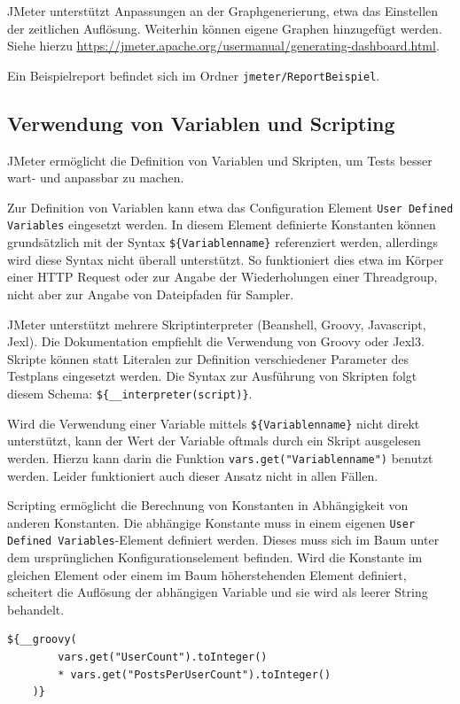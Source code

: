JMeter unterstützt Anpassungen an der Graphgenerierung, etwa das Einstellen der zeitlichen Auflösung.
Weiterhin können eigene Graphen hinzugefügt werden. 
Siehe hierzu \url{https://jmeter.apache.org/usermanual/generating-dashboard.html}.

Ein Beispielreport befindet sich im Ordner \texttt{jmeter/ReportBeispiel}.



\subsection{Verwendung von Variablen und Scripting}

JMeter ermöglicht die Definition von Variablen und Skripten, um Tests besser wart- und anpassbar zu machen.

Zur Definition von Variablen kann etwa das Configuration Element \texttt{User Defined Variables} eingesetzt werden.
In diesem Element definierte Konstanten können grundsätzlich mit der Syntax \lstinline|${Variablenname}| referenziert werden,
allerdings wird diese Syntax nicht überall unterstützt.
So funktioniert dies etwa im Körper einer HTTP Request oder zur Angabe der Wiederholungen einer Threadgroup,
nicht aber zur Angabe von Dateipfaden für Sampler.

JMeter unterstützt mehrere Skriptinterpreter (Beanshell, Groovy, Javascript, Jexl). 
Die Dokumentation empfiehlt die Verwendung von Groovy oder Jexl3.
Skripte können statt Literalen zur Definition verschiedener Parameter des Testplans eingesetzt werden.
Die Syntax zur Ausführung von Skripten folgt diesem Schema: \lstinline|${__interpreter(script)}|.

Wird die Verwendung einer Variable mittels \lstinline|${Variablenname}| nicht direkt unterstützt,
kann der Wert der Variable oftmals durch ein Skript ausgelesen werden.
Hierzu kann darin die Funktion \lstinline{vars.get("Variablenname")} benutzt werden.
Leider funktioniert auch dieser Ansatz nicht in allen Fällen.

Scripting ermöglicht die Berechnung von Konstanten in Abhängigkeit von anderen Konstanten.
Die abhängige Konstante muss in einem eigenen \texttt{User Defined Variables}-Element definiert werden.
Dieses muss sich im Baum unter dem ursprünglichen Konfigurationselement befinden.
Wird die Konstante im gleichen Element oder einem im Baum höherstehenden Element definiert,
scheitert die Auflösung der abhängigen Variable und sie wird als leerer String behandelt.

\begin{lstlisting}[caption=Beispiel eines Groovy-Skripts]
    ${__groovy(
        vars.get("UserCount").toInteger() 
        * vars.get("PostsPerUserCount").toInteger()
    )}
    \end{lstlisting}

